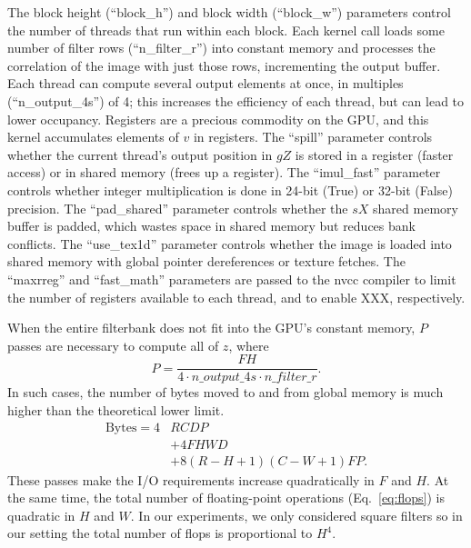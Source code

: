 \documentclass{sig-alternate}
\begin{document}
The block height (``block\_h'') and block width (``block\_w'') parameters control the
number of threads that run within each block.
Each kernel call loads some number of filter rows (``n\_filter\_r'') into
constant memory and processes the correlation of the image with just those
rows, incrementing the output buffer.
Each thread can compute several output elements
at once, in multiples (``n\_output\_4s'') of 4;
this increases the efficiency of each thread, but can lead to lower occupancy.
Registers are a precious commodity on the GPU, and this kernel accumulates
elements of $v$ in registers.
The ``spill'' parameter controls whether the current thread's output position in
$gZ$ is stored in a register (faster access) or in shared memory (frees up
a register).
The ``imul\_fast'' parameter controls whether integer multiplication is done
in 24-bit (True) or 32-bit (False) precision.
The ``pad\_shared'' parameter controls whether the $sX$ shared memory buffer
is padded, which wastes space in shared memory but reduces bank conflicts.
The ``use\_tex1d'' parameter controls whether the image is loaded into shared
memory with global pointer dereferences or texture fetches.
The ``maxrreg'' and ``fast\_math'' parameters are passed to the nvcc compiler to limit
the number of registers available to each thread, and to enable XXX,
respectively.



When the entire filterbank does not fit into the GPU's
constant memory, $P$ passes are necessary to compute all of $z$, where
$$P=\frac{FH}{4 \cdot n\_output\_4s \cdot n\_filter\_r}.$$
In such cases, the number of bytes moved to and from global memory is much higher than
the theoretical lower limit.
\begin{align}
\mathrm{Bytes} = 4&RCDP \nonumber \\
& + 4FHWD \nonumber \\
& + 8(R-H+1)(C-W+1)FP.
\nonumber
\label{eq:bytesP}
\end{align}
These passes make the I/O requirements increase quadratically in $F$ and $H$.
At the same time, the total number of floating-point operations (Eq.~\ref{eq:flops})
is quadratic in $H$ and $W$. In our experiments, we only considered square
filters so in our setting the total number of flops is proportional to $H^4$.
\end{document}
